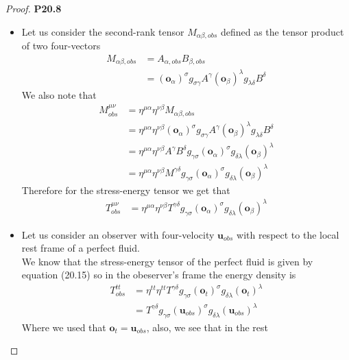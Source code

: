 \documentclass[11pt]{article}
\theoremstyle{definition}
\begin{document}
\cleardoublepage
\begin{proof}{\textbf{P20.8}}
\begin{itemize}
\item [\textbf{a.}]
Let us consider the second-rank tensor $M_{\alpha\beta,obs}$
defined as the tensor product of two four-vectors
\begin{align*}
    M_{\alpha\beta,obs} &= A_{\alpha, obs} B_{\beta, obs}\\
    &= (\bm{o}_{\alpha})^\sigma g_{\sigma\gamma} A^{\gamma}
    (\bm{o}_{\beta})^\lambda g_{\lambda\delta} B^{\delta}
\end{align*}
We also note that
\begin{align*}
    M^{\mu\nu}_{obs}
    &= \eta^{\mu\alpha} \eta^{\nu\beta} M_{\alpha\beta,obs} \\
    &= \eta^{\mu\alpha} \eta^{\nu\beta}
    (\bm{o}_{\alpha})^\sigma g_{\sigma\gamma} A^{\gamma}
    (\bm{o}_{\beta})^\lambda g_{\lambda\delta} B^{\delta} \\
    &= \eta^{\mu\alpha} \eta^{\nu\beta}A^{\gamma}B^{\delta}
    g_{\gamma\sigma} (\bm{o}_{\alpha})^\sigma
    g_{\delta\lambda} (\bm{o}_{\beta})^\lambda \\
    &= \eta^{\mu\alpha} \eta^{\nu\beta}M^{\gamma\delta}
    g_{\gamma\sigma} (\bm{o}_{\alpha})^\sigma
    g_{\delta\lambda} (\bm{o}_{\beta})^\lambda
\end{align*}
Therefore for the stress-energy tensor we get that
\begin{align*}
    T^{\mu\nu}_{obs}
    &= \eta^{\mu\alpha} \eta^{\nu\beta} T^{\gamma\delta}
    g_{\gamma\sigma} (\bm{o}_{\alpha})^\sigma
    g_{\delta\lambda} (\bm{o}_{\beta})^\lambda
\end{align*}
\item [\textbf{b.}]
Let us consider an observer with four-velocity $\bm{u}_{obs}$ with respect 
to the local rest frame of a perfect fluid.\\
We know that the stress-energy tensor of the perfect fluid is given by equation
(20.15) so in the obeserver's frame the energy density is
\begin{align*}
    T^{tt}_{obs}
    &= \eta^{tt} \eta^{tt} T^{\gamma\delta}
    g_{\gamma\sigma} (\bm{o}_{t})^\sigma
    g_{\delta\lambda} (\bm{o}_{t})^\lambda\\
    &= T^{\gamma\delta}
    g_{\gamma\sigma} (\bm{u}_{obs})^\sigma
    g_{\delta\lambda} (\bm{u}_{obs})^\lambda
\end{align*}
Where we used that $\bm{o}_{t} = \bm{u}_{obs}$, also, we see that in the rest

\end{itemize}
\end{proof}
\end{document}

